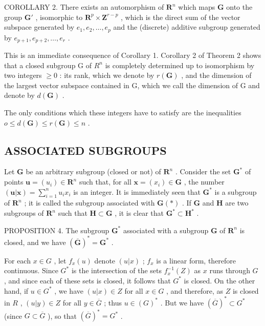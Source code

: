 COROLLARY 2. There exists an automorphism of \(\mathbf{R}^n\) which maps \(\mathbf{G}\) onto the group \(\mathbf{G}'\) , isomorphic to \(\mathbf{R}^p \times \mathbf{Z}^{r-p}\) , which is the direct sum of the vector subspace generated by \(e_1, e_2, \ldots, e_p\) and the (discrete) additive subgroup generated by \(e_{p+1}, e_{p+2}, \ldots, e_r\) .

This is an immediate consequence of Corollary 1. Corollary 2 of Theorem 2 shows that a closed subgroup G of \(R^{n}\) is completely determined up to isomorphism by two integers \(\geqslant 0\) : its rank, which we denote by \(r(\mathbf{G})\) , and the dimension of the largest vector subspace contained in G, which we call the dimension of G and denote by \(d(\mathbf{G})\) .

The only conditions which these integers have to satisfy are the inequalities \(o \leqslant d(\mathbf{G}) \leqslant r(\mathbf{G}) \leqslant n\) .

\subsection{ASSOCIATED SUBGROUPS}

Let \(\mathbf{G}\) be an arbitrary subgroup (closed or not) of \(\mathbf{R}^n\) . Consider the set \(\mathbf{G}^*\) of points \(\boldsymbol{u} = (u_i) \in \mathbf{R}^n\) such that, for all \(\boldsymbol{x} = (x_i) \in \mathbf{G}\) , the number \((\boldsymbol{u}| \boldsymbol{x}) = \sum_{i=1}^{n} u_i x_i\) is an integer. It is immediately seen that \(\mathbf{G}^*\) is a subgroup of \(\mathbf{R}^n\) ; it is called the subgroup associated with \(\mathbf{G}(*)\) . If \(\mathbf{G}\) and \(\mathbf{H}\) are two subgroups of \(\mathbf{R}^n\) such that \(\mathbf{H} \subset \mathbf{G}\) , it is clear that \(\mathbf{G}^* \subset \mathbf{H}^*\) .

PROPOSITION 4. The subgroup \(\mathbf{G}^*\) associated with a subgroup \(\mathbf{G}\) of \(\mathbf{R}^n\) is closed, and we have \((\overline{\mathbf{G}})^* = \mathbf{G}^*\) .

For each \(x \in G\) , let \(f_x(u)\) denote \((u|x)\) ; \(f_x\) is a linear form, therefore continuous. Since \(G^*\) is the intersection of the sets \(f_x^{-1}(Z)\) as \(x\) runs through \(G\) , and since each of these sets is closed, it follows that \(G^*\) is closed. On the other hand, if \(u \in G^*\) , we have \((u|x) \in Z\) for all \(x \in G\) , and therefore, as \(Z\) is closed in \(R\) , \((u|y) \in Z\) for all \(y \in \overline{G}\) ; thus \(u \in (G)^*\) . But we have \((\overline{G})^* \subset G^*\) (since \(G \subset \overline{G}\) ), so that \((\overline{G})^* = G^*\) .

